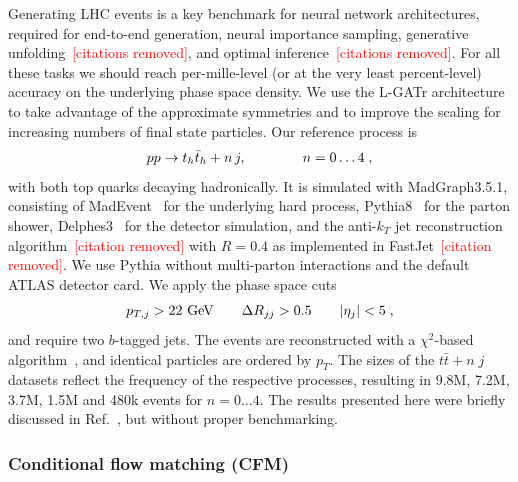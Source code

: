 \documentclass[submission, Phys]{SciPost}
\begin{document}
Generating LHC events is a key benchmark for neural network architectures, required for end-to-end generation, neural importance sampling, generative unfolding\textcolor{red}{~[citations removed]}, and optimal inference\textcolor{red}{~[citations removed]}. For all these tasks we should reach per-mille-level (or at the very least percent-level) accuracy on the underlying phase space density. We use the L-GATr architecture to take advantage of the approximate symmetries and to improve the scaling for increasing numbers of final state particles. Our reference process is 
%
\begin{align}
    pp\to t_h \bar t_h + n\, j , 
    \qquad\qquad n=0\dots 4 \; ,
\end{align}
%
with both top quarks decaying hadronically. It is simulated with MadGraph3.5.1, consisting of MadEvent~\cite{Alwall:2011uj} for the underlying hard process, Pythia8~\cite{Sjostrand:2014zea} for the parton shower, Delphes3~\cite{deFavereau:2013fsa} for the detector simulation, and the anti-$k_T$ jet reconstruction algorithm\textcolor{red}{~[citation removed]} with $R=0.4$ as implemented in FastJet\textcolor{red}{~[citation removed]}. We use Pythia without multi-parton interactions and the default ATLAS detector card. We apply the phase space cuts
%
\begin{align}
 p_{T,j} > 22~\text{GeV} 
 \qquad 
 \Delta R_{jj} > 0.5 
 \qquad |\eta_j| < 5 \; ,
\end{align} 
and require two $b$-tagged jets. The events are reconstructed with a $\chi^2$-based algorithm~\cite{ATLAS:2020ccu}, and identical particles are ordered by $p_T$. The sizes of the $t\bar t+n\; j$ datasets reflect the frequency of the respective processes, resulting in 9.8M, 7.2M, 3.7M, 1.5M and 480k events for $n=0 \ldots 4$. The results presented here were briefly discussed in Ref.~\cite{Spinner:2024hjm}, but without proper benchmarking.

\subsubsection*{Conditional flow matching (CFM)}
\end{document}
